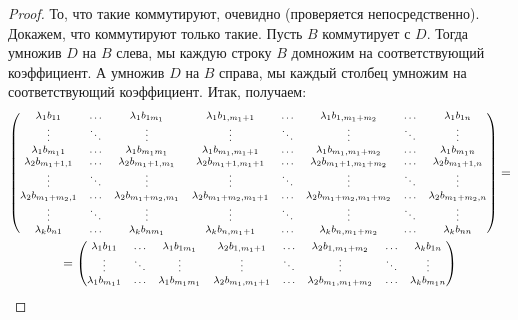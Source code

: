 \begin{proof}
    То, что такие коммутируют, очевидно (проверяется непосредственно). Докажем, что коммутируют только такие. Пусть $B$ коммутирует с $D$. Тогда умножив $D$ на $B$ слева, мы каждую строку $B$ домножим на соответствующий коэффициент. А умножив $D$ на $B$ справа, мы каждый столбец умножим на соответствующий коэффициент. Итак, получаем:
    \begin{multline*}
        \footnotesize
        \begin{pmatrix}
            \lambda_1b_{11} & \ldots & \lambda_1b_{1m_1} & \lambda_1b_{1, m_1 + 1} & \ldots & \lambda_1b_{1, m_1 + m_2} & \ldots & \lambda_1b_{1n}\\
            \vdots & \ddots & \vdots & \vdots & \ddots & \vdots & \ddots & \vdots\\
            \lambda_1b_{m_11} & \ldots & \lambda_1b_{m_1m_1} & \lambda_1b_{m_1, m_1 + 1} & \ldots & \lambda_1b_{m_1, m_1 + m_2} & \ldots & \lambda_1b_{m_1n}\\
            \lambda_2b_{m_1 + 1, 1} & \ldots & \lambda_2b_{m_1 + 1, m_1} & \lambda_2b_{m_1 + 1, m_1 + 1} & \ldots & \lambda_2b_{m_1 + 1, m_1 + m_2} & \ldots & \lambda_2b_{m_1 + 1, n}\\
            \vdots & \ddots & \vdots & \vdots & \ddots & \vdots & \ddots & \vdots\\
            \lambda_2b_{m_1 + m_2, 1} & \ldots & \lambda_2b_{m_1 + m_2, m_1} & \lambda_2b_{m_1 + m_2, m_1 + 1} & \ldots & \lambda_2b_{m_1 + m_2, m_1 + m_2} & \ldots & \lambda_2b_{m_1 + m_2, n}\\
            \vdots & \ddots & \vdots & \vdots & \ddots & \vdots & \ddots & \vdots\\
            \lambda_kb_{n1} & \ldots & \lambda_kb_{nm_1} & \lambda_kb_{n, m_1 + 1} & \ldots & \lambda_kb_{n, m_1 + m_2} & \ldots & \lambda_kb_{nn}\\
        \end{pmatrix} =\\ =\footnotesize
        \begin{pmatrix}
            \lambda_1b_{11} & \ldots & \lambda_1b_{1m_1} & \lambda_2b_{1, m_1 + 1} & \ldots & \lambda_2b_{1, m_1 + m_2} & \ldots & \lambda_kb_{1n}\\
            \vdots & \ddots & \vdots & \vdots & \ddots & \vdots & \ddots & \vdots\\
            \lambda_1b_{m_11} & \ldots & \lambda_1b_{m_1m_1} & \lambda_2b_{m_1, m_1 + 1} & \ldots & \lambda_2b_{m_1, m_1 + m_2} & \ldots & \lambda_kb_{m_1n}\\

\end{pmatrix}
\end{multline*}
\end{proof}
